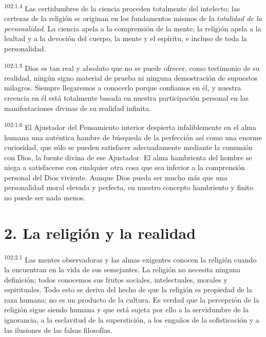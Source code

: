 \documentclass[twoside, 11pt]{book}
\begin{document}
\par
\textsuperscript{102:1.4} Las certidumbres de la ciencia proceden totalmente del intelecto; las certezas de la religión se originan en los fundamentos mismos de la \textit{totalidad de la personalidad}. La ciencia apela a la comprensión de la mente; la religión apela a la lealtad y a la devoción del cuerpo, la mente y el espíritu, e incluso de toda la personalidad.

\par
\textsuperscript{102:1.5} Dios es tan real y absoluto que no se puede ofrecer, como testimonio de su realidad, ningún signo material de prueba ni ninguna demostración de supuestos milagros. Siempre llegaremos a conocerlo porque confiamos en él, y nuestra creencia en él está totalmente basada en nuestra participación personal en las manifestaciones divinas de su realidad infinita.

\par
\textsuperscript{102:1.6} El Ajustador del Pensamiento interior despierta infaliblemente en el alma humana una auténtica hambre de búsqueda de la perfección así como una enorme curiosidad, que sólo se pueden satisfacer adecuadamente mediante la comunión con Dios, la fuente divina de ese Ajustador. El alma hambrienta del hombre se niega a satisfacerse con cualquier otra cosa que sea inferior a la comprensión personal del Dios viviente. Aunque Dios pueda ser mucho más que una personalidad moral elevada y perfecta, en nuestro concepto hambriento y finito no puede ser nada menos.

\section*{2. La religión y la realidad}
\par
\textsuperscript{102:2.1} Las mentes observadoras y las almas exigentes conocen la religión cuando la encuentran en la vida de sus semejantes. La religión no necesita ninguna definición; todos conocemos sus frutos sociales, intelectuales, morales y espirituales. Todo esto se deriva del hecho de que la religión es propiedad de la raza humana; no es un producto de la cultura. Es verdad que la percepción de la religión sigue siendo humana y que está sujeta por ello a la servidumbre de la ignorancia, a la esclavitud de la superstición, a los engaños de la sofisticación y a las ilusiones de las falsas filosofías.
\end{document}
